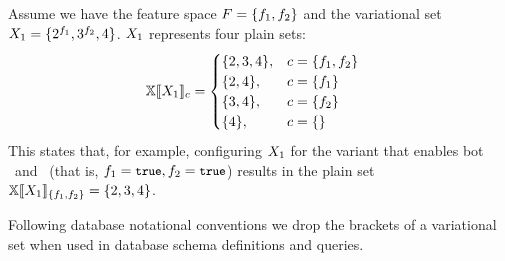 \begin{example}
\label{eg:vset-conf}
Assume we have the feature space $\features = \setDef {\A, \B}$ 
and the variational set $\vset_1 = \setDef {\annot [\A] 2, \annot [\B] 3, 4}$.
$\vset_1$ represents four plain sets:
\begin{alignat*}{1}
\osetSem {\vset_1} &=
\begin{cases}
  \setDef{2,3,4}, & \config = \setDef{\A,\B}\\
  \setDef{2,4}, & \config = \setDef{\A}\\
  \setDef{3,4}, & \config = \setDef{\B}\\
  \setDef{4}, & \config = \setDef { }
\end{cases}
\end{alignat*}
This states that, for example, configuring $\vset_1$ for the variant that enables 
bot \A\ and \B\ (that is, \ensuremath{\A = \t, \B = \t}) results in the plain set
\ensuremath{ \osetSem [\setDef {\A, \B}] {\vset_1} = \setDef {2,3,4} }.
\end{example}

%
Following database notational conventions
we drop the brackets of a variational set when used in database
schema definitions and queries.


